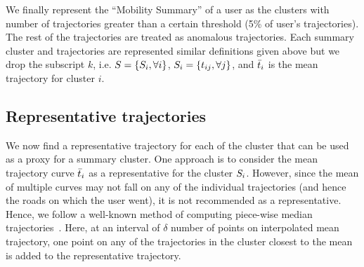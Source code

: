 We finally represent the ``Mobility Summary'' of a user as the clusters with number of trajectories greater than a certain threshold (5\% of user's trajectories). The rest of the trajectories are treated as anomalous trajectories. Each summary cluster and trajectories are represented similar definitions given above but we drop the subscript $k$, i.e. $S=\{S_i,\forall i\}$, $S_i=\{t_{ij}, \forall j\}$, and $\bar{t}_i$ is the mean trajectory for cluster $i$. 

\subsection{Representative trajectories}
We now find a representative trajectory for each of the cluster that can be used as a proxy for a summary cluster. One approach is to consider the mean trajectory curve $\bar{t}_i$ as a representative for the cluster $S_i$. However, since the mean of multiple curves may not fall on any of the individual trajectories (and hence the roads on which the user went), it is not recommended as a representative. Hence, we follow a well-known method of computing piece-wise median trajectories~\cite{medianTraj}. Here, at an interval of $\delta$ number of points on interpolated mean trajectory, one point on any of the trajectories in the cluster closest to the mean is added to the representative trajectory. 

